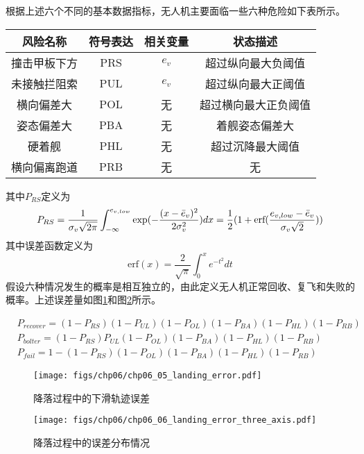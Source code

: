 根据上述六个不同的基本数据指标，无人机主要面临一些六种危险如下表所示。
\begin{table}
	\centering
	\begin{tabular}{cccc}
		\hline
		\textbf{风险名称} & \textbf{符号表达} & \textbf{相关变量} & \textbf{状态描述}       \\ \hline
		撞击甲板下方 & PRS  & $e_v$ & 超过纵向最大负阈值  \\
		未接触拦阻索 & PUL  & $e_v$ & 超过纵向最大正阈值  \\
		横向偏差大  & POL  & 无   & 超过横向最大正负阈值 \\
		姿态偏差大  & PBA  & 无    & 着舰姿态偏差大    \\
		硬着舰    & PHL  & 无   & 超过沉降最大阈值   \\
		横向偏离跑道 & PRB  & 无    & 无          \\  \hline
	\end{tabular}
\end{table}
其中$P_{RS}$定义为
\begin{equation}
P_{RS}=\frac{1}{\sigma_v\sqrt{2\pi}}\int_{-\infty}^{e_{v,low}}\exp(-\frac{(x-\bar{e}_v)^2}{2\sigma_v^2})dx \\
=\frac{1}{2}(1+\text{erf}(\frac{e_{v, low}-\bar{e}_v}{\sigma_v\sqrt{2}}))
\end{equation}
其中误差函数定义为
\begin{equation}
\text{erf}(x)=\frac{2}{\sqrt{\pi}}\int_{0}^{x}e^{-t^2}dt
\end{equation}
假设六种情况发生的概率是相互独立的，由此定义无人机正常回收、复飞和失败的概率。上述误差量如图\ref{fig:chp06_05_landing_error}和图\ref{fig:chp06_06_landing_error_three_axis}所示。

\begin{align}
&P_{recover}=(1-P_{RS})(1-P_{UL})(1-P_{OL})(1-P_{BA})(1-P_{HL})(1-P_{RB}) \\
&P_{bolter}=(1-P_{RS})P_{UL}(1-P_{OL})(1-P_{BA})(1-P_{HL})(1-P_{RB}) \\
&P_{fail}=1-(1-P_{RS})(1-P_{OL})(1-P_{BA})(1-P_{HL})(1-P_{RB})
\end{align}




\begin{figure}[!tb]
	\centering
	\texttt{[image: figs/chp06/chp06\_05\_landing\_error.pdf]}	
	\caption{降落过程中的下滑轨迹误差}
	\label{fig:chp06_05_landing_error}
\end{figure}

\begin{figure}[!tb]
	\centering
	\texttt{[image: figs/chp06/chp06\_06\_landing\_error\_three\_axis.pdf]}	
	\caption{降落过程中的误差分布情况}
	\label{fig:chp06_06_landing_error_three_axis}
\end{figure}

